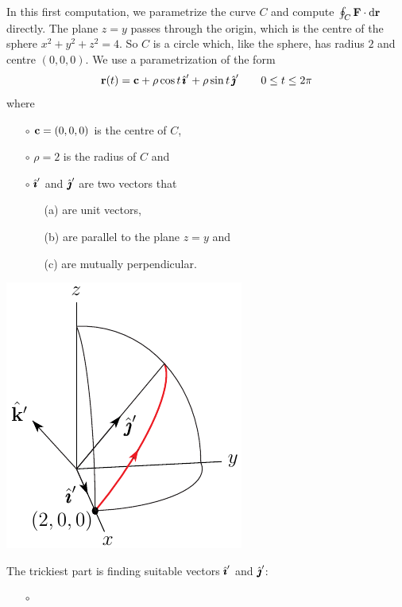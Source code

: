 \begin{eg}
\noindent
In this first computation, we parametrize the curve $C$ and compute
$\oint_C\mathbf{F}\cdot \mathrm{d}\mathbf{r}$ directly. The plane $z=y$ passes through the origin,
which is the centre of the sphere $x^2+y^2+z^2=4$. 
So $C$ is a circle which, like the sphere, has radius $2$ and centre 
$(0,0,0)$. We use a parametrization of the form 
$$
\mathbf{r}(t)=\mathbf{c}+\rho\cos t\,\hat{\pmb{\imath}}'+ \rho\sin t\,\hat{\pmb{\jmath}}'
\qquad 0\le t\le 2\pi
$$
where 
    \begin{itemize}\itemsep1pt \parskip0pt  %
     \item[$\circ$]
      $\mathbf{c}=(0,0,0)$ is the centre of $C$, 
      \item[$\circ$]
      $\rho=2$ is the radius of $C$ and 
      \item[$\circ$]
       $\hat{\pmb{\imath}}'$ and $\hat{\pmb{\jmath}}'$ are two vectors that 
       \begin{itemize}\itemsep1pt \parskip0pt  %
        \item[(a)] are unit vectors, 
        \item[(b)] are parallel to the plane $z=y$ and 
        \item[(c)] are mutually perpendicular. 
        \end{itemize}
\end{itemize}
\begin{nfig}
\begin{center}
    \includegraphics{circle4a.pdf}
\end{center}
\end{nfig}
The trickiest part is finding suitable vectors $\hat{\pmb{\imath}}'$ and $\hat{\pmb{\jmath}}'$:
    \begin{itemize}\itemsep1pt \parskip0pt  %
     \item[$\circ$]

\end{itemize}
\end{eg}
